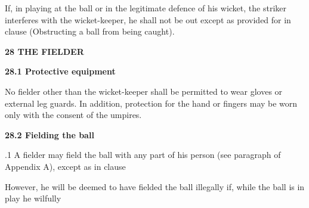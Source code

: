 \documentclass[12pt]{article}
\begin{document}
\vspace{\baselineskip}
\begin{adjustwidth}{0.0in}{0.06in}
{\fontsize{9pt}{10.8pt}\selectfont If, in playing at the ball or in the legitimate defence of his wicket, the striker interferes with the wicket-keeper, he shall not be out except as provided for in clause (Obstructing a ball from being caught).\par}\par

\end{adjustwidth}


\vspace{\baselineskip}
{\fontsize{16pt}{19.2pt}\selectfont \textbf{28 THE FIELDER}\par}\par


\vspace{\baselineskip}
{\fontsize{11pt}{13.2pt}\selectfont \textbf{28.1 \tabto{0.47in} Protective equipment}\par}\par


\vspace{\baselineskip}
\begin{adjustwidth}{0.0in}{0.57in}
{\fontsize{9pt}{10.8pt}\selectfont No fielder other than the wicket-keeper shall be permitted to wear gloves or external leg guards. In addition, protection for the hand or fingers may be worn only with the consent of the umpires.\par}\par

\end{adjustwidth}


\vspace{\baselineskip}
{\fontsize{11pt}{13.2pt}\selectfont \textbf{28.2 \tabto{0.47in} Fielding the ball}\par}\par


\vspace{\baselineskip}
{\fontsize{9pt}{10.8pt}.1 \tabto{0.49in} A fielder may field the ball with any part of his person (see paragraph of Appendix A), except as in clause\par}\par


\vspace{\baselineskip}
\begin{adjustwidth}{0.5in}{0.0in}
{\fontsize{9pt}{10.8pt}\selectfont However, he will be deemed to have fielded the ball illegally if, while the ball is in play he wilfully\par}\par

\end{adjustwidth}
\end{document}
